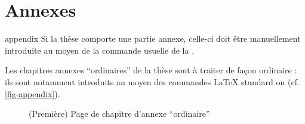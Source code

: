 \chapter{Annexes}\label{cha-annexes}

\begin{docCommand}{appendix}{}
  Si la thèse comporte une partie annexe, celle-ci doit être manuellement
  introduite au moyen de la commande usuelle  de la
  \nofrontmatter.
\end{docCommand}

Les chapitres annexes \enquote{ordinaires} de la thèse sont à traiter de façon
ordinaire : ils sont notamment introduits au moyen des commandes \LaTeX{}
standard  ou  (cf.
\vref{fig-appendix}).

\begin{figure}[htbp]
  \centering
  \caption[Chapitre d'annexe \enquote{ordinaire}]{(Première) Page de chapitre
    d'annexe \enquote{ordinaire}}
  \label{fig-appendix}
\end{figure}

%
\iffalse
\fi

